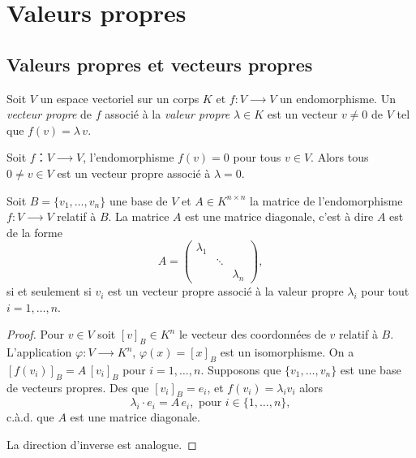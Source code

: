 \chapter{Valeurs propres}
\label{cha:valeurs-propres-et}

\section{Valeurs propres et vecteurs propres}
\label{sec:valeurs-propres-et}

\begin{definition}
  \label{def:16}
  Soit $V$ un espace vectoriel sur un corps $K$ et $f \colon V ⟶V$ un endomorphisme. Un \emph{vecteur propre} de $f$  associé à la \emph{valeur propre} $λ ∈K$ est un vecteur $v ≠ 0$ de $V$ tel que $f(v) = λ\,v$.
\end{definition}

\begin{example}
  \label{exe:23}
  Soit $f：V⟶V$, l'endomorphisme $f(v) = 0$ pour tous $v ∈V$. Alors tous $0≠v ∈V$ est un vecteur propre associé à $λ=0$. 
\end{example}


\begin{lemma}
  \label{lem:4}
  Soit $B = \{v_1,\dots,v_n\}$ une base de $V$ et $A ∈ K^{n×n}$ la matrice de l'endomorphisme $f : V ⟶V$ relatif à $B$. La matrice $A$ est une matrice diagonale, c'est à dire $A$ est de la forme
  \begin{displaymath}
    A =
    \begin{pmatrix}
      λ_1  \\
         & \ddots \\
         & & λ_n
    \end{pmatrix},
  \end{displaymath}
si et seulement si $v_i$ est un vecteur propre associé à la valeur propre $λ_i$ pour tout $i=1,\dots,n$.
\end{lemma}

\begin{proof}
  Pour $v ∈V$ soit $[v]_B ∈K^n$ le vecteur des coordonnées de $v$ relatif à $B$. L'application $φ: V ⟶ K^n$, $φ(x) = [x]_B$ est un isomorphisme.  On a $[f(v_i)]_B = A \,  [v_i]_B$ pour $i=1,\dots,n$.
Supposons que $\{v_1,\dots,v_n\}$ est une base de vecteurs propres. 
  Des que $[v_i]_B = e_i$, et $f(v_i) = λ_i v_i$ alors
    \begin{displaymath}
      λ_i ⋅ e_i = A \, e_i, \text{ pour } i ∈\{1,\dots,n\},
    \end{displaymath}
    c.à.d. que $A$ est une matrice diagonale.

La direction d'inverse est analogue. 
\end{proof}


